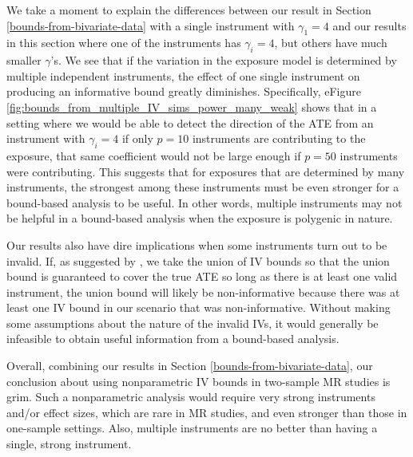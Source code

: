 \documentclass[
]{article}
\theoremstyle{plain}
\begin{document}
We take a moment to explain the differences between our result in Section \ref{bounds-from-bivariate-data} with a single instrument with \(\gamma_1 = 4\) and our results in this section where one of the instruments has \(\gamma_i = 4\), but others have much smaller \(\gamma\)'s. We see that if the variation in the exposure model is determined by multiple independent instruments, the effect of one single instrument on producing an informative bound greatly diminishes. Specifically, eFigure \ref{fig:bounds_from_multiple_IV_sims_power_many_weak} shows that in a setting where we would be able to detect the direction of the ATE from an instrument with \(\gamma_i = 4\) if only \(p = 10\) instruments are contributing to the exposure, that same coefficient would not be large enough if \(p = 50\) instruments were contributing. This suggests that for exposures that are determined by many instruments, the strongest among these instruments must be even stronger for a bound-based analysis to be useful. In other words, multiple instruments may not be helpful in a bound-based analysis when the exposure is polygenic in nature.

Our results also have dire implications when some instruments turn out to be invalid. If, as suggested by \textcite{swanson_commentary_2017}, we take the union of IV bounds so that the union bound is guaranteed to cover the true ATE so long as there is at least one valid instrument, the union bound will likely be non-informative because there was at least one IV bound in our scenario that was non-informative. Without making some assumptions about the nature of the invalid IVs, it would generally be infeasible to obtain useful information from a bound-based analysis.

Overall, combining our results in Section \ref{bounds-from-bivariate-data}, our conclusion about using nonparametric IV bounds in two-sample MR studies is grim. Such a nonparametric analysis would require very strong instruments and/or effect sizes, which are rare in MR studies, and even stronger than those in one-sample settings. Also, multiple instruments are no better than having a single, strong instrument.
\end{document}

